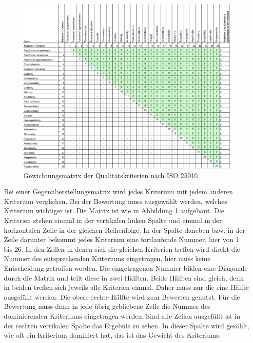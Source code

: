 \begin{figure}[htb]
	\centering
	\includegraphics[width=\textwidth]{img/3_entwicklung_neues_kontept/Gewichtung}
	\caption{Gewichtungsmatrix der Qualitätskriterien nach ISO 25010}
	\label{fig:gewichtung}
\end{figure}
\newpage

Bei einer Gegenüberstellungsmatrix wird jedes Kriterium mit jedem anderen Kriterium verglichen.
Bei der Bewertung muss ausgewählt werden, welches Kriterium wichtiger ist. Die Matrix ist wie in Abbildung \ref{fig:gewichtung} aufgebaut. Die Kriterien stehen einmal in der vertikalen linken Spalte und einmal in der horizontalen Zeile in der gleichen Reihenfolge. In der Spalte daneben bzw. in der Zeile darunter bekommt jedes Kriterium eine fortlaufende Nummer, hier von 1 bis 26. In den Zellen in denen sich die gleichen Kriterien treffen wird direkt die Nummer des entsprechenden Kriteriums eingetragen, hier muss keine Entscheidung getroffen werden. Die eingetragenen Nummer bilden eine Diagonale durch die Matrix und teilt diese in zwei Hälften. Beide Hälften sind gleich, denn in beiden treffen sich jeweils alle Kriterien einmal. Daher muss nur die eine Hälfte ausgefüllt werden. Die obere rechte Hälfte wird zum Bewerten genutzt. Für die Bewertung muss dann in jede übrig gebliebene Zelle die Nummer des dominierenden Kriteriums eingetragen werden. Sind alle Zellen ausgefüllt ist in der rechten vertikalen Spalte das Ergebnis zu sehen. In dieser Spalte wird gezählt, wie oft ein Kriterium dominiert hat, das ist das Gewicht des Kriteriums.\\



